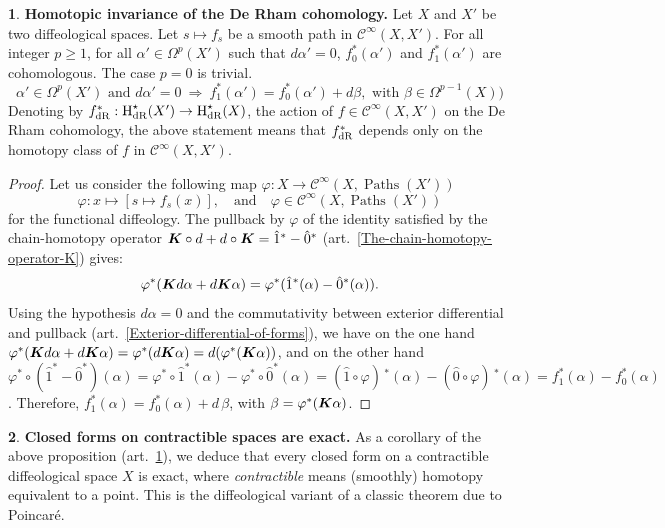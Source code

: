 \documentclass[11pt,reqno]{amsart}
\theoremstyle{definition}
\newtheorem{article}{}
\newcommand{\artlabel}[1]{{\bf #1.}}
\newcommand{\qmbox}[1]{\quad \mbox{#1}\quad}
\def \X{{X}}
\newcommand{\cC}{{\mathcal C}}
\newcommand{\eK}{\mbox{\boldmath $K$}}
\newcommand{\art}[1]{{(art.~\ref{#1})}}
\newcommand{\DForms}{\Omega}
\newcommand{\Paths}{\operatorname{Paths}}
\newcommand{\source}{\hat 0}
\newcommand{\but}{\hat 1}
\newcommand{\HDR}{{\operatorname{H}}_{\mathrm{dR}}}
\newcommand{\Cinf}{{\cC}^\infty}
\begin{document}
  \begin{article}\artlabel{Homotopic invariance of the De Rham cohomology} 
    \label{Homotopic-invariance-of-the-De-Rham-cohomology}
    Let $\X$ and $\X'$ be two diffeological spaces. Let $s \mapsto f_s$ be
    a smooth path in $\Cinf(\X,\X')$. For all integer $p \geq 1$, for 
    all $\alpha' \in \DForms^p(X')$ such that $d\alpha' = 0$, $f_0^*(\alpha')$ 
    and $f_1^*(\alpha')$ are cohomologous. The case $p=0$ is trivial.
    $$
     \alpha' \in \DForms^p(X') \mbox{ and } d\alpha' = 0 \ \Rightarrow \
     f_1^*(\alpha') = f_0^*(\alpha') + d\beta, \mbox{ with } \beta \in  \DForms^{p-1}(X))
    $$
    Denoting by $f^*_{\rm dR} : \HDR^\star(\X') \to \HDR^\star(\X)$, the action
    of $f \in \Cinf(\X,\X')$ on the De Rham cohomology, the above statement means that
    $f^*_{\rm dR}$ depends only on the homotopy class of $f$ in $\Cinf(\X,\X')$.
  \end{article} %
  
  \begin{proof}
    Let us consider the following map $\varphi : \X \to \Cinf(\X,\Paths(\X'))$
      $$
      \varphi: x \mapsto [s \mapsto f_s(x)], \qmbox{and} \varphi \in
      \Cinf(\X,\Paths(\X'))
      $$ 
    for the
    functional diffeology. The pullback by $\varphi$ of
    the identity satisfied by the chain-homotopy operator
    $\eK \circ d + d \circ \eK = \but^* - \source^*$ \art{The-chain-homotopy-operator-K} gives:
      $$
        \varphi^*(\eK d \alpha + d\eK \alpha) = \varphi^* (\but^*(\alpha)-\source^*(\alpha)).
      $$ 
Using the hypothesis
    $d\alpha = 0$ and the commutativity between exterior
    differential and pullback
    \art{Exterior-differential-of-forms}, we have on the one
    hand $\varphi^*(\eK d \alpha + d\eK \alpha) = 
      \varphi^*(d\eK \alpha) = d(\varphi^*(\eK\alpha))$, and on the other hand $\varphi^* \circ
      (\but^*-\source^*)(\alpha) = \varphi^* \circ
      \but^*(\alpha)-\varphi^* \circ \source^*(\alpha) =
      (\but\circ\varphi)\,^*(\alpha) -
      (\source\circ\varphi)\,^*(\alpha) = f_1^*(\alpha)-f_0^*(\alpha)$.
    Therefore, $f_1^*(\alpha) =
      f_0^*(\alpha) + d\,\beta$, with $\beta =
        \varphi^*(\eK\alpha)$. 
  \end{proof}
  
  \begin{article}\artlabel{Closed forms on contractible spaces are exact} 
    \label{Closed-forms-on-contractible-spaces-are-exact}
    As a corollary of the above proposition
    \art{Homotopic-invariance-of-the-De-Rham-cohomology}, we
    deduce that every closed form on a contractible
    diffeological space $\X$ is exact, where {\em contractible} means 
    (smoothly) homotopy equivalent to a point. This is the diffeological variant
    of a classic theorem due to Poincar\'e.
  \end{article} %
  
\end{document}
